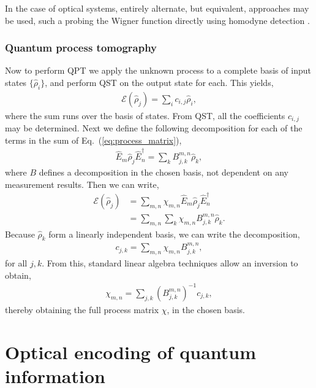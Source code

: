 \documentclass[aps, rmp, twocolumn, amsmath, amssymb, nofootinbib, superscriptaddress, longbibliography, floatfix, table-of-contents, eqsecnum]{revtex4-1}
\begin{document}
In the case of optical systems, entirely alternate, but equivalent, approaches may be used, such a probing the Wigner function directly using homodyne detection \cite{???}.

%
%

\subsubsection{Quantum process tomography} 

Now to perform QPT we apply the unknown process to a complete basis of input states $\{\hat\rho_i\}$, and perform QST on the output state for each. This yields,
\begin{align}
\mathcal{E}(\hat\rho_j) = \sum_{i} c_{i,j} \hat\rho_i,
\end{align}
where the sum runs over the basis of states. From QST, all the coefficients $c_{i,j}$ may be determined. Next we define the following decomposition for each of the terms in the sum of Eq.~(\ref{eq:process_matrix}),
\begin{align}
\hat{E}_m \hat\rho_j \hat{E}_n^\dag = \sum_k B^{m,n}_{j,k} \hat\rho_k,
\end{align}
where $B$ defines a decomposition in the chosen basis, not dependent on any measurement results. Then we can write,
\begin{align}
\mathcal{E}(\hat\rho_j) &= \sum_{m,n} \chi_{m,n} \hat{E}_m\hat\rho_j\hat{E}_n^\dag \nonumber \\
&= \sum_{m,n} \sum_k \chi_{m,n} B^{m,n}_{j,k} \hat\rho_k.
\end{align}
Because $\hat\rho_k$ form a linearly independent basis, we can write the decomposition,
\begin{align}
c_{j,k} = \sum_{m,n} \chi_{m,n} B_{j,k}^{m,n},
\end{align}
for all \mbox{$j,k$}. From this, standard linear algebra techniques allow an inversion to obtain,
\begin{align}
\chi_{m,n} = \sum_{j,k} (B_{j,k}^{m,n})^{-1} c_{j,k},
\end{align}
thereby obtaining the full process matrix $\chi$, in the chosen basis.

%
%

\section{Optical encoding of quantum information} \label{sec:opt_enc_of_qi} 
\end{document}

